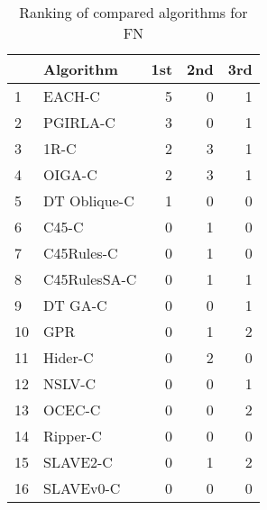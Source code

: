 \begin{table}
\footnotesize
\caption{Ranking of compared algorithms for FN}
\label{tab:places FN}
\begin{tabular}{llrrr}
\hline
 & Algorithm & 1st & 2nd & 3rd \\
\hline
1 & EACH-C & 5 & 0 & 1 \\
2 & PGIRLA-C & 3 & 0 & 1 \\
3 & 1R-C & 2 & 3 & 1 \\
4 & OIGA-C & 2 & 3 & 1 \\
5 & DT Oblique-C & 1 & 0 & 0 \\
6 & C45-C & 0 & 1 & 0 \\
7 & C45Rules-C & 0 & 1 & 0 \\
8 & C45RulesSA-C & 0 & 1 & 1 \\
9 & DT GA-C & 0 & 0 & 1 \\
10 & GPR & 0 & 1 & 2 \\
11 & Hider-C & 0 & 2 & 0 \\
12 & NSLV-C & 0 & 0 & 1 \\
13 & OCEC-C & 0 & 0 & 2 \\
14 & Ripper-C & 0 & 0 & 0 \\
15 & SLAVE2-C & 0 & 1 & 2 \\
16 & SLAVEv0-C & 0 & 0 & 0 \\
\hline
\end{tabular}
\end{table}
